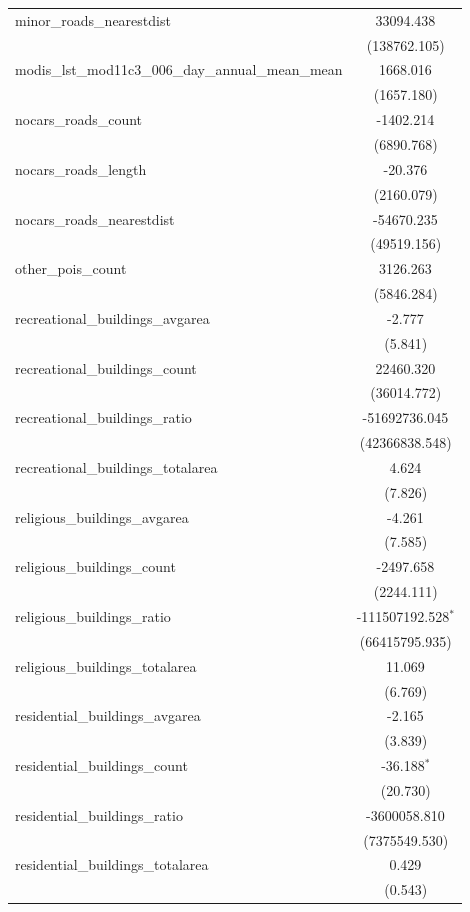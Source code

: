 \begin{table}[!htbp]
\begin{tabular}{@{\extracolsep{5pt}}lc}
 minor_roads_nearestdist & 33094.438$^{}$ \\
  & (138762.105) \\
 modis_lst_mod11c3_006_day_annual_mean_mean & 1668.016$^{}$ \\
  & (1657.180) \\
 nocars_roads_count & -1402.214$^{}$ \\
  & (6890.768) \\
 nocars_roads_length & -20.376$^{}$ \\
  & (2160.079) \\
 nocars_roads_nearestdist & -54670.235$^{}$ \\
  & (49519.156) \\
 other_pois_count & 3126.263$^{}$ \\
  & (5846.284) \\
 recreational_buildings_avgarea & -2.777$^{}$ \\
  & (5.841) \\
 recreational_buildings_count & 22460.320$^{}$ \\
  & (36014.772) \\
 recreational_buildings_ratio & -51692736.045$^{}$ \\
  & (42366838.548) \\
 recreational_buildings_totalarea & 4.624$^{}$ \\
  & (7.826) \\
 religious_buildings_avgarea & -4.261$^{}$ \\
  & (7.585) \\
 religious_buildings_count & -2497.658$^{}$ \\
  & (2244.111) \\
 religious_buildings_ratio & -111507192.528$^{*}$ \\
  & (66415795.935) \\
 religious_buildings_totalarea & 11.069$^{}$ \\
  & (6.769) \\
 residential_buildings_avgarea & -2.165$^{}$ \\
  & (3.839) \\
 residential_buildings_count & -36.188$^{*}$ \\
  & (20.730) \\
 residential_buildings_ratio & -3600058.810$^{}$ \\
  & (7375549.530) \\
 residential_buildings_totalarea & 0.429$^{}$ \\
  & (0.543) \\

\end{tabular}
\end{table}
